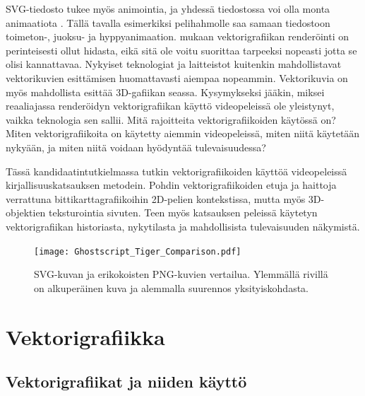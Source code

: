 \documentclass[utf8,bachelor]{gradu3}
\begin{document}
SVG-tiedosto tukee myös animointia, ja yhdessä tiedostossa voi olla monta animaatiota \parencite{RefWorks:doc:5bd74719e4b0e42e08f6333b}. Tällä tavalla esimerkiksi pelihahmolle saa samaan tiedostoon toimeton-, juoksu- ja hyppyanimaation. \textcite{RefWorks:doc:5bc4a5cce4b080e02f7eff1b} mukaan vektorigrafiikan renderöinti on perinteisesti ollut hidasta, eikä sitä ole voitu suorittaa tarpeeksi nopeasti jotta se olisi kannattavaa. Nykyiset teknologiat ja laitteistot kuitenkin mahdollistavat vektorikuvien esittämisen huomattavasti aiempaa nopeammin. Vektorikuvia on myös mahdollista esittää 3D-gafiikan seassa. \parencite{RefWorks:doc:5bc4a5cce4b080e02f7eff1b} Kysymykseksi jääkin, miksei reaaliajassa renderöidyn vektorigrafiikan käyttö videopeleissä ole yleistynyt, vaikka teknologia sen sallii. Mitä rajoitteita vektorigrafiikoiden käytössä on? Miten vektorigrafiikoita on käytetty aiemmin videopeleissä, miten niitä käytetään nykyään, ja miten niitä voidaan hyödyntää tulevaisuudessa?

Tässä kandidaatintutkielmassa tutkin vektorigrafiikoiden käyttöä videopeleissä kirjallisuuskatsauksen metodein. Pohdin vektorigrafiikoiden etuja ja haittoja verrattuna bittikarttagrafiikoihin 2D-pelien kontekstissa, mutta myös 3D-objektien teksturointia sivuten. Teen myös katsauksen peleissä käytetyn vektorigrafiikan historiasta, nykytilasta ja mahdollisista tulevaisuuden näkymistä.

\begin{figure}[!b]
	\centering
	\texttt{[image: Ghostscript\_Tiger\_Comparison.pdf]}
    \caption{SVG-kuvan ja erikokoisten PNG-kuvien vertailua. Ylemmällä rivillä on alkuperäinen kuva ja alemmalla suurennos yksityiskohdasta.}\label{tiikeri}
\end{figure}

\chapter{Vektorigrafiikka}

\section{Vektorigrafiikat ja niiden käyttö}\label{määrittely}

\end{document}
